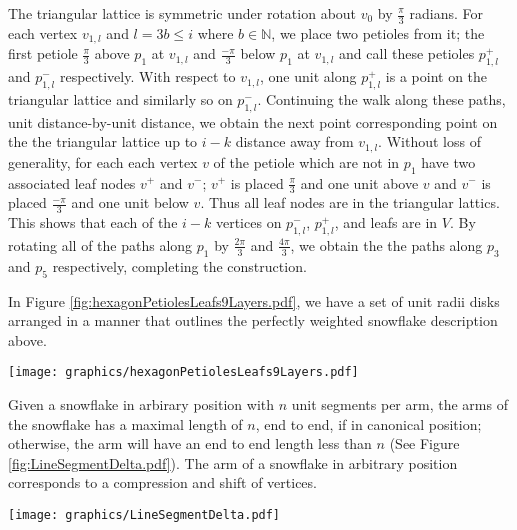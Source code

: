 \documentclass[10pt]{CSUNthesis}
\theoremstyle{plain}%
\theoremstyle{definition}
\theoremstyle{remark}
\newcommand{\bbN}{{\mathbb{N}}}
\begin{document}
The triangular lattice is symmetric under rotation about $v_0$ by $\frac{\pi}{3}$ radians.  
For each vertex $v_{1,l}$ and $l = 3 b \leq i$ where $b \in \bbN$, we place two petioles from it; the first petiole $\frac{\pi}{3}$ above $p_1$ at $v_{1,l}$ and $\frac{-\pi}{3}$ below $p_1$ at $v_{1,l}$ and call these petioles $p_{1,l}^+$ and $p_{1,l}^-$ respectively.  
With respect to $v_{1,l}$, one unit along $p_{1,l}^+$ is a point on the triangular lattice and similarly so on $p_{1,l}^-$.  
Continuing the walk along these paths, unit distance-by-unit distance, we obtain the next point corresponding point on the the triangular lattice up to $i-k$ distance away from $v_{1,l}$.  
Without loss of generality, for each each vertex $v$ of the petiole which are not in $p_1$ have two associated leaf nodes $v^+$ and $v^-$; $v^+$ is placed $\frac{\pi}{3}$ and one unit above $v$ and $v^-$ is placed $\frac{-\pi}{3}$ and one unit below $v$.  
Thus all leaf nodes are in the triangular lattics.
This shows that each of the $i-k$ vertices on $p_{1,l}^-$, $p_{1,l}^+$, and leafs are in $V$.
By rotating all of the paths along $p_1$ by $\frac{2\pi}{3}$ and $\frac{4\pi}{3}$, we obtain the the paths along $p_3$ and $p_5$ respectively, completing the construction.

In Figure \ref{fig:hexagonPetiolesLeafs9Layers.pdf}, we have a set of unit radii disks arranged in a manner that outlines the perfectly weighted snowflake description above.

\begin{minipage}{\linewidth}
\begin{center}
\texttt{[image: graphics/hexagonPetiolesLeafs9Layers.pdf]}
\label{fig:hexagonPetiolesLeafs9Layers.pdf}
\end{center}
\end{minipage}
Given a snowflake in arbirary position with $n$ unit segments per arm, the arms of the snowflake has a maximal length of $n$, end to end, if in canonical position; otherwise, the arm will have an end to end length less than $n$ (See Figure \ref{fig:LineSegmentDelta.pdf}).  
The arm of a snowflake in arbitrary position corresponds to a compression and shift of vertices.  


\begin{minipage}{\linewidth}
\begin{center}
\texttt{[image: graphics/LineSegmentDelta.pdf]}
\label{fig:LineSegmentDelta.pdf}
\end{center}
\end{minipage}
\end{document}
